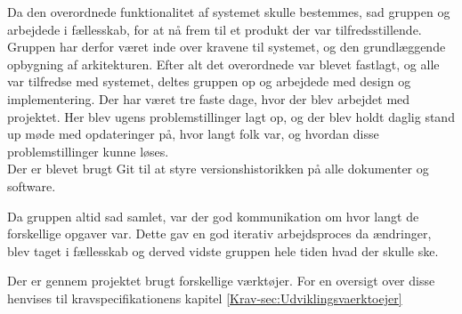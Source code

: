 Da den overordnede funktionalitet af systemet skulle bestemmes, sad gruppen og arbejdede i fællesskab, for at nå frem til et produkt der var tilfredsstillende. Gruppen har derfor været inde over kravene til systemet, og den grundlæggende opbygning af arkitekturen.
Efter alt det overordnede var blevet fastlagt, og alle var tilfredse med systemet, deltes gruppen op og arbejdede med design og implementering.
Der har været tre faste dage, hvor der blev arbejdet med projektet. Her blev ugens problemstillinger lagt op, og der blev holdt daglig stand up møde med opdateringer på, hvor langt folk var, og hvordan disse problemstillinger kunne løses. \\
Der er blevet brugt Git til at styre versionshistorikken på alle dokumenter og software. 

Da gruppen altid sad samlet, var der god kommunikation om hvor langt de forskellige opgaver var.
Dette gav en god iterativ arbejdsproces da ændringer, blev taget i fællesskab og derved vidste gruppen hele tiden hvad der skulle ske.

Der er gennem projektet brugt forskellige værktøjer. For en oversigt over disse henvises til kravspecifikationens kapitel \ref{Krav-sec:Udviklingsvaerktoejer}
